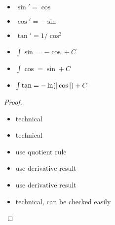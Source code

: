 \begin{property}
	\begin{itemize}
		\item $\sin' = \cos$
		\item $\cos' = -\sin$
		\item $\tan' = 1/\cos^2$
		\item $\int \sin = -\cos + C$
		\item $\int \cos = \sin + C$
		\item $\int \tan = -\ln(| \cos |) + C$
	\end{itemize}
\end{property}
\begin{proof}
	\begin{itemize}
		\item technical
		\item technical
		\item use quotient rule
		\item use derivative result
		\item use derivative result
		\item technical, can be checked easily
	\end{itemize}
\end{proof}




